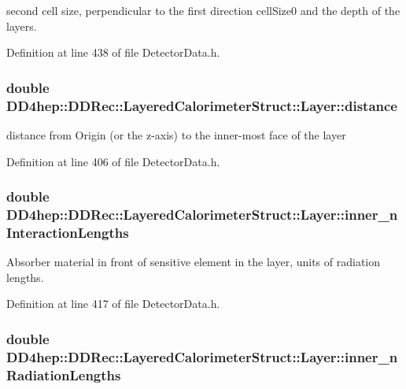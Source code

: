 second cell size, perpendicular to the first direction cellSize0 and the depth of the layers. 

Definition at line 438 of file DetectorData.h.\hypertarget{struct_d_d4hep_1_1_d_d_rec_1_1_layered_calorimeter_struct_1_1_layer_a27ab51429cf061a2b184dc248402a10f}{
\subsubsection[{distance}]{\setlength{\rightskip}{0pt plus 5cm}double {\bf DD4hep::DDRec::LayeredCalorimeterStruct::Layer::distance}}}
\label{struct_d_d4hep_1_1_d_d_rec_1_1_layered_calorimeter_struct_1_1_layer_a27ab51429cf061a2b184dc248402a10f}


distance from Origin (or the z-\/axis) to the inner-\/most face of the layer 

Definition at line 406 of file DetectorData.h.\hypertarget{struct_d_d4hep_1_1_d_d_rec_1_1_layered_calorimeter_struct_1_1_layer_a096850bcaa7ae3e30b2c135cdcfc4502}{
\subsubsection[{inner\_\-nInteractionLengths}]{\setlength{\rightskip}{0pt plus 5cm}double {\bf DD4hep::DDRec::LayeredCalorimeterStruct::Layer::inner\_\-nInteractionLengths}}}
\label{struct_d_d4hep_1_1_d_d_rec_1_1_layered_calorimeter_struct_1_1_layer_a096850bcaa7ae3e30b2c135cdcfc4502}


Absorber material in front of sensitive element in the layer, units of radiation lengths. 

Definition at line 417 of file DetectorData.h.\hypertarget{struct_d_d4hep_1_1_d_d_rec_1_1_layered_calorimeter_struct_1_1_layer_aeb711a3f909969fd48ea8e3f6b67473b}{
\subsubsection[{inner\_\-nRadiationLengths}]{\setlength{\rightskip}{0pt plus 5cm}double {\bf DD4hep::DDRec::LayeredCalorimeterStruct::Layer::inner\_\-nRadiationLengths}}}
\label{struct_d_d4hep_1_1_d_d_rec_1_1_layered_calorimeter_struct_1_1_layer_aeb711a3f909969fd48ea8e3f6b67473b}


